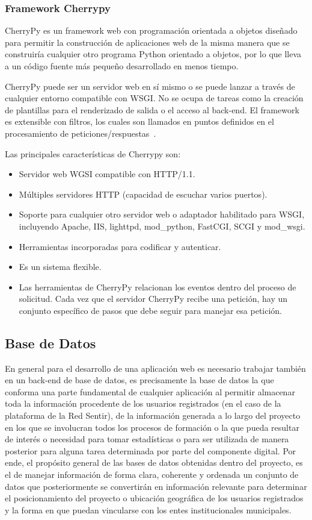 \documentclass[journal,transmag]{IEEEtran}
\begin{document}
\subsubsection{Framework Cherrypy}\label{sub:cherrypy}
CherryPy es un framework web con programación orientada a objetos diseñado para permitir la construcción de aplicaciones web de la misma manera que se construiría cualquier otro programa Python orientado a objetos, por lo que lleva a un código fuente más pequeño desarrollado en menos tiempo.

CherryPy puede ser un servidor web en sí mismo o se puede lanzar a través de cualquier entorno compatible con WSGI. No se ocupa de tareas como la creación de plantillas para el renderizado de salida o el acceso al back-end. El framework es extensible con filtros, los cuales son llamados en puntos definidos en el procesamiento de peticiones/respuestas~\cite{Cherrypy}.

Las principales características de Cherrypy son:

\begin{itemize}
	\item Servidor web WGSI compatible con HTTP/1.1.
	\item Múltiples servidores HTTP (capacidad de escuchar varios puertos).
	\item Soporte para cualquier otro servidor web o adaptador habilitado para WSGI, incluyendo Apache, 	IIS, lighttpd, mod\_python, FastCGI, SCGI y mod\_wsgi.
	\item Herramientas incorporadas para codificar y autenticar.
	\item Es un sistema flexible.
	\item Las herramientas de CherryPy relacionan los eventos dentro del proceso de solicitud. Cada vez que el servidor CherryPy recibe una petición, hay un conjunto específico de pasos que debe seguir para manejar esa petición.
\end{itemize}

\subsection{Base de Datos}
En general para el desarrollo de una aplicación web es necesario trabajar también en un back-end de base de datos, es precisamente la base de datos la que conforma una parte fundamental de cualquier aplicación al permitir almacenar toda la información procedente de los usuarios registrados (en el caso de la plataforma de la Red Sentir), de la información generada a lo largo del proyecto en los que se involucran todos los procesos de formación o la que pueda resultar de interés o necesidad para tomar estadísticas o para ser utilizada de manera posterior para alguna tarea determinada por parte del componente digital. Por ende, el propósito general de las bases de datos obtenidas dentro del proyecto, es el de manejar información de forma clara, coherente y ordenada un conjunto de datos que posteriormente se convertirán en información relevante para determinar el posicionamiento del proyecto o ubicación geográfica de los usuarios registrados y la forma en que puedan vincularse con los entes institucionales municipales. 
\end{document}
